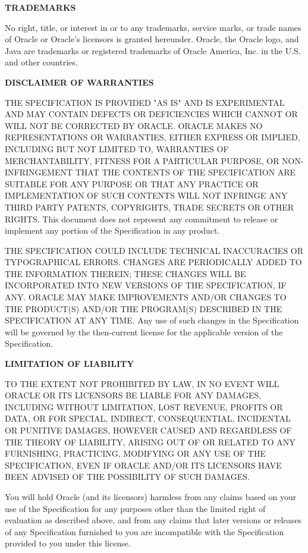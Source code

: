 \begin{flushleft}
\vspace{1em}
{\bfseries TRADEMARKS}

No right, title, or interest in or to any trademarks, service marks, or trade names of Oracle or Oracle's licensors is granted hereunder. Oracle, the Oracle logo, and Java are trademarks or registered trademarks of Oracle America, Inc. in the U.S. and other countries.

\vspace{1em}
{\bfseries DISCLAIMER OF WARRANTIES}

THE SPECIFICATION IS PROVIDED "AS IS" AND IS EXPERIMENTAL AND MAY CONTAIN DEFECTS OR DEFICIENCIES WHICH CANNOT OR WILL NOT BE CORRECTED BY ORACLE. ORACLE MAKES NO REPRESENTATIONS OR WARRANTIES, EITHER EXPRESS OR IMPLIED, INCLUDING BUT NOT LIMITED TO, WARRANTIES OF MERCHANTABILITY, FITNESS FOR A PARTICULAR PURPOSE, OR NON-INFRINGEMENT THAT THE CONTENTS OF THE SPECIFICATION ARE SUITABLE FOR ANY PURPOSE OR THAT ANY PRACTICE OR IMPLEMENTATION OF SUCH CONTENTS WILL NOT INFRINGE ANY THIRD PARTY PATENTS, COPYRIGHTS, TRADE SECRETS OR OTHER RIGHTS. This document does not represent any commitment to release or implement any portion of the Specification in any product.

THE SPECIFICATION COULD INCLUDE TECHNICAL INACCURACIES OR TYPOGRAPHICAL ERRORS. CHANGES ARE PERIODICALLY ADDED TO THE INFORMATION THEREIN; THESE CHANGES WILL BE INCORPORATED INTO NEW VERSIONS OF THE SPECIFICATION, IF ANY. ORACLE MAY MAKE IMPROVEMENTS AND/OR CHANGES TO THE PRODUCT(S) AND/OR THE PROGRAM(S) DESCRIBED IN THE SPECIFICATION AT ANY TIME. Any use of such changes in the Specification will be governed by the then-current license for the applicable version of the Specification.

\vspace{1em}
{\bfseries LIMITATION OF LIABILITY}

TO THE EXTENT NOT PROHIBITED BY LAW, IN NO EVENT WILL ORACLE OR ITS LICENSORS BE LIABLE FOR ANY DAMAGES, INCLUDING WITHOUT LIMITATION, LOST REVENUE, PROFITS OR DATA, OR FOR SPECIAL,
INDIRECT, CONSEQUENTIAL, INCIDENTAL OR PUNITIVE DAMAGES, HOWEVER CAUSED AND REGARDLESS OF THE THEORY OF LIABILITY, ARISING OUT OF OR RELATED TO ANY FURNISHING, PRACTICING, MODIFYING OR ANY USE OF THE SPECIFICATION, EVEN IF ORACLE AND/OR ITS LICENSORS HAVE BEEN ADVISED OF THE POSSIBILITY OF SUCH DAMAGES.

You will hold Oracle (and its licensors) harmless from any claims based on your use of the Specification for any purposes other than the limited right of evaluation as described above, and from any claims that later versions or releases of any Specification furnished to you are incompatible with the Specification provided to you under this license.


\end{flushleft}
